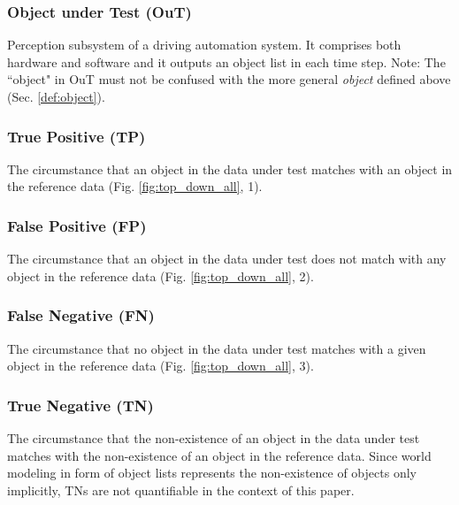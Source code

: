 \documentclass[conference]{IEEEtran}
\begin{document}
\subsubsection{Object under Test (OuT)} \label{def:out} Perception subsystem of a driving automation system. It comprises both hardware and software and it outputs an object list in each time step. Note: The ``object" in OuT must not be confused with the more general \textit{object} defined above (Sec. \ref{def:object}).

\subsubsection{True Positive (TP)} \label{def:tp} The circumstance that an object in the data under test matches with an object in the reference data (Fig. \ref{fig:top_down_all}, 1).

\subsubsection{False Positive (FP)} \label{def:fp} The circumstance that an object in the data under test does not match with any object in the reference data (Fig. \ref{fig:top_down_all}, 2). 

\subsubsection{False Negative (FN)} \label{def:fn} The circumstance that no object in the data under test matches with a given object in the reference data (Fig. \ref{fig:top_down_all}, 3).

\subsubsection{True Negative (TN)} \label{def:tn} The circumstance that the non-existence of an object in the data under test matches with the non-existence of an object in the reference data. Since world modeling in form of object lists represents the non-existence of objects only implicitly, TNs are not quantifiable in the context of this paper.

\end{document}
